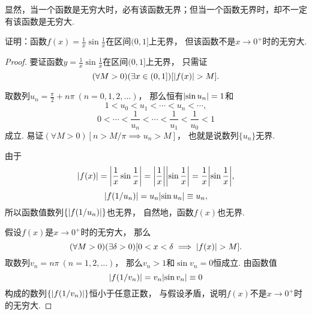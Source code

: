 显然，当一个函数是无穷大时，必有该函数无界；但当一个函数无界时，却不一定有该函数是无穷大.
\begin{example}
证明：函数\(f(x) = \frac{1}{x} \sin\frac{1}{x}\)在区间\((0,1]\)上无界，
但该函数不是\(x\to0^+\)时的无穷大.
\begin{proof}
要证函数\(y = \frac{1}{x} \sin\frac{1}{x}\)在区间\((0,1]\)上无界，
只需证\[
	(\forall M > 0)
	(\exists x \in (0,1])
	[\abs{f(x)} > M].
\]

取数列\(u_n = \frac{\pi}{2} + n\pi\ (n=0,1,2,\dotsc)\)，
那么恒有\(\abs{\sin u_n} = 1\)和\[
	1 < u_0 < u_1 < \dotsb < u_n < \dotsb,
\]\[
	0 < \dotsb < \frac{1}{u_n} < \dotsb < \frac{1}{u_1} < \frac{1}{u_0} < 1
\]成立.
易证\((\forall M > 0)[n > M/\pi \implies u_n > M]\)，
也就是说数列\(\{u_n\}\)无界.

由于\[
	\abs{f(x)} = \abs{\frac{1}{x} \sin\frac{1}{x}}
	= \abs{\frac{1}{x}} \abs{\sin\frac{1}{x}}
	= \frac{1}{x} \abs{\sin\frac{1}{x}},
\]\[
	\abs{f(1/u_n)}
	= u_n \abs{\sin u_n} \equiv u_n,
\]
所以函数值数列\(\{\abs{f(1/u_n)}\}\)也无界，
自然地，函数\(f(x)\)也无界.

假设\(f(x)\)是\(x\to0^+\)时的无穷大，
那么\[
	(\forall M > 0)
	(\exists \delta > 0)
	[
		0 < x < \delta
		\implies
		\abs{f(x)} > M
	].
\]
取数列\(v_n = n\pi\ (n=1,2,\dotsc)\)，
那么\(v_n > 1\)和\(\sin v_n = 0\)恒成立.
由函数值\[
	\abs{f(1/v_n)} = v_n \abs{\sin v_n} \equiv 0
\]构成的数列\(\{\abs{f(1/v_n)}\}\)恒小于任意正数，
与假设矛盾，说明\(f(x)\)不是\(x\to0^+\)时的无穷大.
\end{proof}
\end{example}
